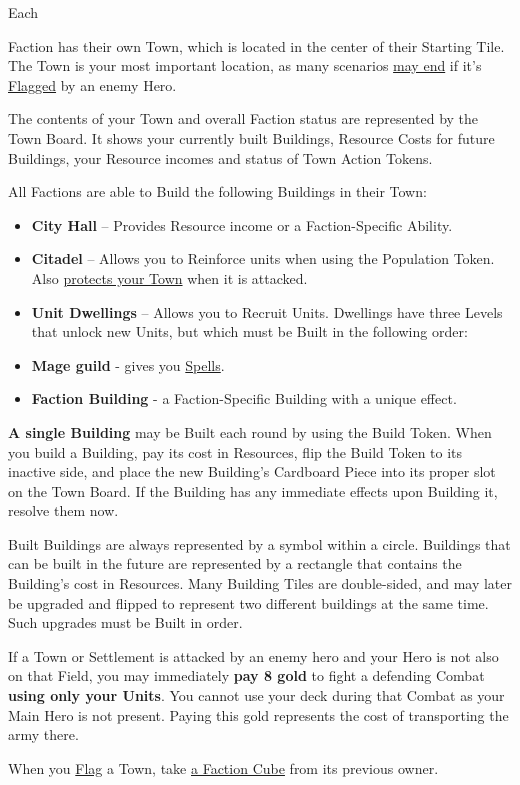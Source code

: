 
\begin{multicols*}{2}

\hypertarget{Town}{Each} Faction has their own Town, which is located in the center of their Starting Tile.
The Town is your most important location, as many scenarios \hyperlink{End}{may end} if it's \hyperlink{Categories}{Flagged} by an enemy Hero.\par
The contents of your Town and overall Faction status are represented by the Town Board.
It shows your currently built Buildings, Resource Costs for future Buildings, your Resource incomes and status of Town Action Tokens.\par
All Factions are able to Build the following Buildings in their Town:
\begin{itemize}
  \item \textbf{City Hall} – Provides Resource income or a Faction-Specific Ability.
  \item \textbf{Citadel} – Allows you to Reinforce units when using the Population Token.
Also \hyperlink{Walls}{protects your Town} when it is attacked.
  \item \textbf{Unit Dwellings} – Allows you to Recruit Units.
Dwellings have three Levels that unlock new Units, but which must be Built in the following order:
  \item \textbf{Mage guild} - gives you \hyperlink{spells}{Spells}.
  \item \textbf{Faction Building} - a Faction-Specific Building with a unique effect.
\end{itemize}
\textbf{A single Building} may be Built each round by using the Build Token.
When you build a Building, pay its cost in Resources, flip the Build Token to its inactive side, and place the new Building’s Cardboard Piece into its proper slot on the Town Board.
If the Building has any immediate effects upon Building it, resolve them now.\par
Built Buildings are always represented by a symbol within a circle.
Buildings that can be built in the future are represented by a rectangle that contains the Building's cost in Resources.
Many Building Tiles are double-sided, and may later be upgraded and flipped to represent two different buildings at the same time. Such upgrades must be Built in order.\par
If a Town or Settlement is attacked by an enemy hero and your Hero is not also on that Field, you may immediately \textbf{pay 8 gold} to fight a defending Combat \textbf{using only your Units}.
You cannot use your deck during that Combat as your Main Hero is not present.
Paying this gold represents the cost of transporting the army there.\par
When you \hyperlink{Categories}{Flag} a Town, take \hyperlink{End}{a Faction Cube} from its previous owner.

\end{multicols*}
